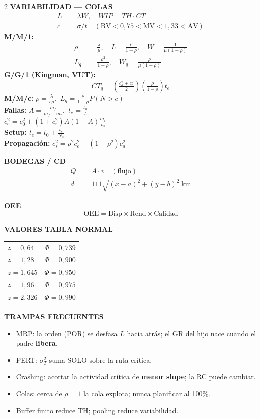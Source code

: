 \begin{multicols}{2}
\textbf{\color{gopblue} VARIABILIDAD --- COLAS}
\begin{align*}
  L &= \lambda W,\quad WIP = TH\cdot CT\\
  c &= \sigma/t \quad (\text{BV} < 0{,}75 < \text{MV} < 1{,}33 < \text{AV})
\end{align*}
\textbf{M/M/1:}
\begin{align*}
  \rho &= \tfrac{\lambda}{\mu},\quad L = \tfrac{\rho}{1-\rho},\quad W = \tfrac{1}{\mu(1-\rho)}\\
  L_q &= \tfrac{\rho^2}{1-\rho},\quad W_q = \tfrac{\rho}{\mu(1-\rho)}
\end{align*}
\textbf{G/G/1 (Kingman, VUT):}
\[
  CT_q = \left(\tfrac{c_a^2 + c_e^2}{2}\right)\left(\tfrac{\rho}{1-\rho}\right)t_e
\]
\textbf{M/M/c:} $\rho = \tfrac{\lambda}{c\mu}$,\ $L_q = \tfrac{\rho}{1-\rho}P(N > c)$\\
\textbf{Fallas:} $A = \tfrac{m_f}{m_f+m_r}$,\ $t_e = \tfrac{t_0}{A}$\\
$c_e^2 = c_0^2 + (1+c_r^2)A(1-A)\tfrac{m_r}{t_0}$\\
\textbf{Setup:} $t_e = t_0 + \tfrac{t_s}{N_s}$\\
\textbf{Propagación:} $c_s^2 = \rho^2 c_e^2 + (1-\rho^2)c_a^2$

\textbf{\color{gopblue} BODEGAS / CD}
\begin{align*}
  Q &= A\cdot v \quad (\text{flujo})\\
  d &= 111\sqrt{(x{-}a)^2 + (y{-}b)^2}\ \text{km}
\end{align*}

\textbf{\color{gopblue} OEE}
\[
  \text{OEE} = \text{Disp}\times\text{Rend}\times\text{Calidad}
\]

\textbf{\color{gopred} VALORES TABLA NORMAL}\\
\begin{tabular}{@{}ll@{}}
$z=0{,}64$ & $\Phi=0{,}739$\\
$z=1{,}28$ & $\Phi=0{,}900$\\
$z=1{,}645$ & $\Phi=0{,}950$\\
$z=1{,}96$ & $\Phi=0{,}975$\\
$z=2{,}326$ & $\Phi=0{,}990$\\
\end{tabular}

\end{multicols}

\textbf{\color{goporange} TRAMPAS FRECUENTES}
\begin{itemize}[leftmargin=1.4em, itemsep=0pt]
  \item MRP: la orden (POR) se desfasa $L$ hacia atrás; el GR del hijo nace cuando el padre \textbf{libera}.
  \item PERT: $\sigma_T^2$ suma SOLO sobre la ruta crítica.
  \item Crashing: acortar la actividad crítica de \textbf{menor slope}; la RC puede cambiar.
  \item Colas: cerca de $\rho=1$ la cola explota; nunca planificar al 100\%.
  \item Buffer finito reduce TH; pooling reduce variabilidad.
\end{itemize}

